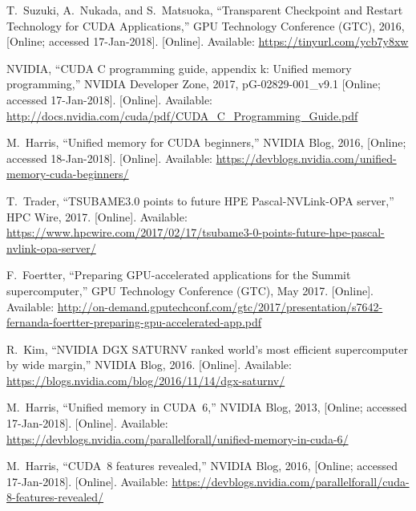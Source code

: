 \documentclass[11pt]{article}
\begin{document}
\begin{thebibliography}{10}
\BIBentryALTinterwordspacing
T.~Suzuki, A.~Nukada, and S.~Matsuoka, ``{T}ransparent {C}heckpoint and
  {R}estart {T}echnology for {CUDA} {A}pplications,'' GPU Technology Conference
  (GTC), 2016, [Online; accessed 17-Jan-2018]. [Online]. Available:
  \url{https://tinyurl.com/ycb7y8xw}
\BIBentrySTDinterwordspacing

\BIBentryALTinterwordspacing
NVIDIA, ``{CUDA} {C} programming guide, appendix k: Unified memory
  programming,'' NVIDIA Developer Zone, 2017, pG-02829-001\_v9.1 [Online;
  accessed 17-Jan-2018]. [Online]. Available:
  \url{http://docs.nvidia.com/cuda/pdf/CUDA_C_Programming_Guide.pdf}
\BIBentrySTDinterwordspacing

\BIBentryALTinterwordspacing
M.~Harris, ``Unified memory for {CUDA} beginners,'' NVIDIA Blog, 2016, [Online;
  accessed 18-Jan-2018]. [Online]. Available:
  \url{https://devblogs.nvidia.com/unified-memory-cuda-beginners/}
\BIBentrySTDinterwordspacing

\BIBentryALTinterwordspacing
T.~Trader, ``{TSUBAME3.0} points to future {HPE} {P}ascal-{NVL}ink-{OPA}
  server,'' HPC Wire, 2017. [Online]. Available:
  \url{https://www.hpcwire.com/2017/02/17/tsubame3-0-points-future-hpe-pascal-nvlink-opa-server/}
\BIBentrySTDinterwordspacing

\BIBentryALTinterwordspacing
F.~Foertter, ``Preparing {GPU}-accelerated applications for the {S}ummit
  supercomputer,'' GPU Technology Conference (GTC), May 2017. [Online].
  Available:
  \url{http://on-demand.gputechconf.com/gtc/2017/presentation/s7642-fernanda-foertter-preparing-gpu-accelerated-app.pdf}
\BIBentrySTDinterwordspacing

\BIBentryALTinterwordspacing
R.~Kim, ``{NVIDIA} {DGX} {SATURNV} ranked world's most efficient supercomputer
  by wide margin,'' NVIDIA Blog, 2016. [Online]. Available:
  \url{https://blogs.nvidia.com/blog/2016/11/14/dgx-saturnv/}
\BIBentrySTDinterwordspacing

\BIBentryALTinterwordspacing
M.~Harris, ``Unified memory in {CUDA}~6,'' NVIDIA Blog, 2013, [Online; accessed
  17-Jan-2018]. [Online]. Available:
  \url{https://devblogs.nvidia.com/parallelforall/unified-memory-in-cuda-6/}
\BIBentrySTDinterwordspacing

\BIBentryALTinterwordspacing
M.~Harris, ``{CUDA}~8 features revealed,'' NVIDIA Blog, 2016, [Online; accessed
  17-Jan-2018]. [Online]. Available:
  \url{https://devblogs.nvidia.com/parallelforall/cuda-8-features-revealed/}
\BIBentrySTDinterwordspacing


\end{thebibliography}
\end{document}
